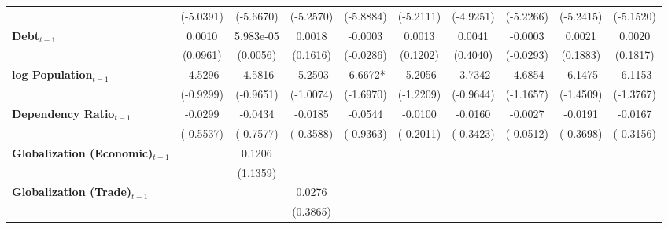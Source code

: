 \begin{center}
\begin{tabular}{lccccccccc}
\textbf{ }                         &   (-5.0391)    &    (-5.6670)     &    (-5.2570)     &    (-5.8884)     &    (-5.2111)     &    (-4.9251)     &    (-5.2266)     &    (-5.2415)     &    (-5.1520)      \\
\textbf{Debt$_{t-1}$}                &     0.0010     &    5.983e-05     &      0.0018      &     -0.0003      &      0.0013      &      0.0041      &     -0.0003      &      0.0021      &      0.0020       \\
\textbf{ }                         &    (0.0961)    &     (0.0056)     &     (0.1616)     &    (-0.0286)     &     (0.1202)     &     (0.4040)     &    (-0.0293)     &     (0.1883)     &     (0.1817)      \\
\textbf{log Population$_{t-1}$}      &    -4.5296     &     -4.5816      &     -5.2503      &     -6.6672*     &     -5.2056      &     -3.7342      &     -4.6854      &     -6.1475      &     -6.1153       \\
\textbf{ }                         &   (-0.9299)    &    (-0.9651)     &    (-1.0074)     &    (-1.6970)     &    (-1.2209)     &    (-0.9644)     &    (-1.1657)     &    (-1.4509)     &    (-1.3767)      \\
\textbf{Dependency Ratio$_{t-1}$}   &    -0.0299     &     -0.0434      &     -0.0185      &     -0.0544      &     -0.0100      &     -0.0160      &     -0.0027      &     -0.0191      &     -0.0167       \\
\textbf{ }                         &   (-0.5537)    &    (-0.7577)     &    (-0.3588)     &    (-0.9363)     &    (-0.2011)     &    (-0.3423)     &    (-0.0512)     &    (-0.3698)     &    (-0.3156)      \\
\textbf{Globalization (Economic)$_{t-1}$}             &                &      0.1206      &                  &                  &                  &                  &                  &                  &                   \\
\textbf{ }                         &                &     (1.1359)     &                  &                  &                  &                  &                  &                  &                   \\
\textbf{Globalization (Trade)$_{t-1}$}             &                &                  &      0.0276      &                  &                  &                  &                  &                  &                   \\
\textbf{ }                         &                &                  &     (0.3865)     &                  &                  &                  &                  &                  &                   \\

\end{tabular}
\end{center}
